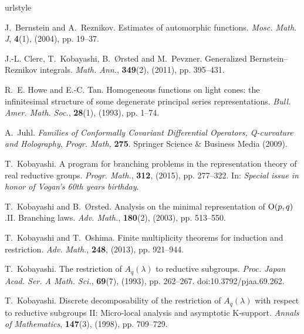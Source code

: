 \begin{thebibliography}{CK{\O}P11}
\expandafter\ifx\csname urlstyle\endcsname\relax
  \providecommand{\doi}[1]{doi:\discretionary{}{}{}#1}\else
  \providecommand{\doi}{doi:\discretionary{}{}{}\begingroup
  \urlstyle{rm}\Url}\fi

J.~Bernstein and A.~Reznikov.
\newblock Estimates of automorphic functions.
\newblock \emph{Mosc. Math. J}, \textbf{\textbf{4}}(1), (2004), pp. 19--37.

J.-L. Clerc, T.~Kobayashi, B.~{\O}rsted and M.~Pevzner.
\newblock Generalized {B}ernstein--{R}eznikov integrals.
\newblock \emph{Math. Ann.}, \textbf{349}(2), (2011), pp. 395--431.

R.~E. Howe and E.-C. Tan.
\newblock Homogeneous functions on light cones: the infinitesimal structure of
  some degenerate principal series representations.
\newblock \emph{Bull. Amer. Math. Soc.}, \textbf{28}(1), (1993), pp. 1--74.

A.~Juhl.
\newblock \emph{Families of {C}onformally {C}ovariant {D}ifferential
  {O}perators, {Q}-curvature and {H}olography}, \emph{Progr. Math,}
  \textbf{275}.
\newblock Springer Science \& Business Media (2009).

T.~Kobayashi.
\newblock A program for branching problems in the representation theory of real
  reductive groups.
\newblock \emph{Progr. Math.}, \textbf{312}, (2015), pp. 277--322.
\newblock In: \emph{{\normalfont Special issue in honor of Vogan's 60th years
  birthday}}.

T.~Kobayashi and B.~{\O}rsted.
\newblock Analysis on the minimal representation of\/ {${\rm
  O}(p,q)$}.{\;}{{\rm{II}}}. {B}ranching laws.
\newblock \emph{Adv. Math.}, \textbf{180}(2), (2003), pp. 513--550.

T.~Kobayashi and T.~Oshima.
\newblock Finite multiplicity theorems for induction and restriction.
\newblock \emph{Adv. Math.}, \textbf{248}, (2013), pp. 921--944.

T.~Kobayashi.
\newblock The restriction of ${A}_q \left( \lambda \right)$ to reductive
  subgroups.
\newblock \emph{Proc. Japan Acad. Ser. A Math. Sci.}, \textbf{69}(7), (1993),
  pp. 262--267.
\newblock \doi{10.3792/pjaa.69.262}.

T.~Kobayashi.
\newblock Discrete decomposability of the restriction of ${A}_q(\lambda)$ with
  respect to reductive subgroups {I}{I}: Micro-local analysis and asymptotic
  {K}-support.
\newblock \emph{Annals of Mathematics}, \textbf{147}(3), (1998), pp. 709--729.


\end{thebibliography}
